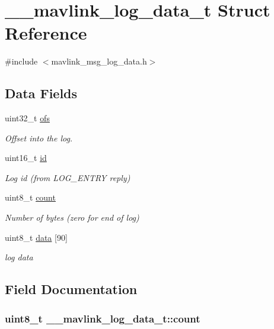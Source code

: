 \hypertarget{struct____mavlink__log__data__t}{\section{\+\_\+\+\_\+mavlink\+\_\+log\+\_\+data\+\_\+t Struct Reference}
\label{struct____mavlink__log__data__t}
}


{\ttfamily \#include $<$mavlink\+\_\+msg\+\_\+log\+\_\+data.\+h$>$}

\subsection*{Data Fields}
\begin{DoxyCompactItemize}
\item 
uint32\+\_\+t \hyperlink{struct____mavlink__log__data__t_a1a0610442e473dbbe22b2f4543cf4932}{ofs}
\begin{DoxyCompactList}\small\item\em Offset into the log. \end{DoxyCompactList}\item 
uint16\+\_\+t \hyperlink{struct____mavlink__log__data__t_aabe2a71a6a74df8e05fa48bf2a16f9d0}{id}
\begin{DoxyCompactList}\small\item\em Log id (from L\+O\+G\+\_\+\+E\+N\+T\+R\+Y reply) \end{DoxyCompactList}\item 
uint8\+\_\+t \hyperlink{struct____mavlink__log__data__t_a8dae080480c4f26b2c6e33bd49094ff8}{count}
\begin{DoxyCompactList}\small\item\em Number of bytes (zero for end of log) \end{DoxyCompactList}\item 
uint8\+\_\+t \hyperlink{struct____mavlink__log__data__t_ae64beb1618aeac94fade1f2dc8607107}{data} \mbox{[}90\mbox{]}
\begin{DoxyCompactList}\small\item\em log data \end{DoxyCompactList}\end{DoxyCompactItemize}


\subsection{Field Documentation}
\hypertarget{struct____mavlink__log__data__t_a8dae080480c4f26b2c6e33bd49094ff8}{
\subsubsection[{count}]{\setlength{\rightskip}{0pt plus 5cm}uint8\+\_\+t \+\_\+\+\_\+mavlink\+\_\+log\+\_\+data\+\_\+t\+::count}}\label{struct____mavlink__log__data__t_a8dae080480c4f26b2c6e33bd49094ff8}


